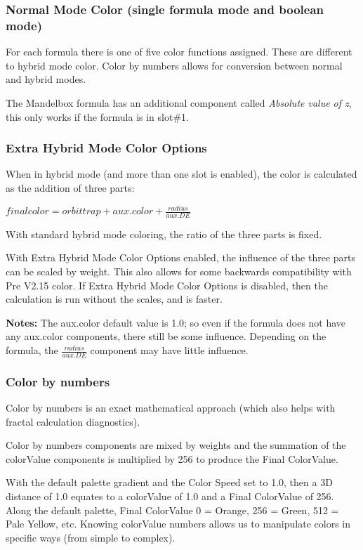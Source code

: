 \subsubsection{Normal Mode Color (single formula mode and boolean mode)}\label{materials-normal-mode-color}

For each formula there is one of five color functions assigned.
These are different to hybrid mode color. Color by numbers allows for conversion between normal and hybrid modes.

The Mandelbox formula has an additional component called \emph{Absolute value of z}, this only works if the formula is in slot\#1.


\subsubsection{Extra Hybrid Mode Color Options}\label{materials-extra-hybrid-mode-color-options}

When in hybrid mode (and more than one slot is enabled), the color is calculated as the addition of three parts:

\(final color = orbit trap  +  aux.color  +  \frac{radius}{aux.DE}\)

With standard hybrid mode coloring, the ratio of the three parts is fixed.

With Extra Hybrid Mode Color Options enabled, the influence of the three parts can be scaled by weight. This also allows for some backwards compatibility with Pre V2.15 color. If Extra Hybrid Mode Color Options is disabled, then the calculation is run without the scales, and is faster.

\textbf{Notes: }The aux.color default value is 1.0; so even if the formula does not have any aux.color components, there still be some influence. Depending on the formula, the \(\frac{radius}{aux.DE}\) component may have little influence.

\subsubsection{Color by numbers}\label{materials-color-by-numbers}

Color by numbers is an exact mathematical approach (which also helps with fractal calculation diagnostics).

Color by numbers components are mixed by weights and the summation of the colorValue components is multiplied by 256 to produce the Final ColorValue.

With the default palette gradient and the Color Speed set to 1.0, then a 3D distance of 1.0 equates to a colorValue of 1.0 and a Final ColorValue of 256. Along the default palette, Final ColorValue 0 = Orange, 256 = Green, 512 = Pale Yellow, etc.
Knowing colorValue numbers allows us to manipulate colors in specific ways (from simple to complex).

